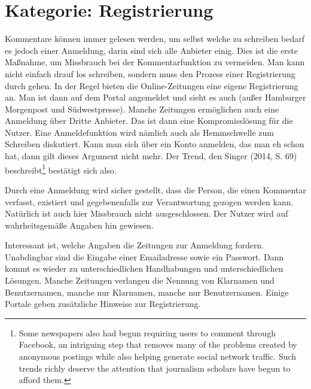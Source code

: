 

\section{Kategorie: \glqq Registrierung\grqq}

Kommentare können immer gelesen werden, um selbst welche zu schreiben bedarf es
jedoch einer Anmeldung, darin sind sich alle Anbieter einig. Dies ist die erste
Maßnahme, um Missbrauch bei der Kommentarfunktion zu vermeiden. Man kann nicht
einfach drauf los schreiben, sondern muss den Prozess einer Registrierung durch
gehen. In der Regel bieten die Online-Zeitungen eine eigene Registrierung an.
Man ist dann auf dem Portal angemeldet und sieht es auch (außer Hamburger
Morgenpost und Südwestpresse). Manche Zeitungen ermöglichen auch eine Anmeldung
über Dritte Anbieter. Das ist dann eine Kompromisslösung für die Nutzer. Eine
Anmeldefunktion wird nämlich auch als Hemmschwelle zum Schreiben diskutiert.
Kann man sich über ein Konto anmelden, das man eh schon hat, dann gilt dieses
Argument nicht mehr. Der Trend, den Singer (2014, S. 69)
beschreibt\footnote{\glqq Some newspapers also had begun requiring users to
comment through Facebook, an intriguing step that removes many of the problems
created by anonymous postings while also helping generate social network
traffic. Such trends richly deserve the attention that journalism scholars have
begun to afford them.\grqq} bestätigt sich also.

Durch eine Anmeldung wird sicher gestellt, dass die Person, die einen Kommentar
verfasst, existiert und gegebenenfalls zur Verantwortung gezogen werden kann.
Natürlich ist auch hier Missbrauch nicht ausgeschlossen. Der Nutzer wird auf
wahrheitsgemäße Angaben hin gewiesen. 

Interessant ist, welche Angaben die Zeitungen zur Anmeldung fordern. Unabdingbar
sind die Eingabe einer Emailadresse sowie ein Passwort. Dann kommt es wieder zu
unterschiedlichen Handhabungen und unterschiedlichen Lösungen. Manche Zeitungen
verlangen die Nennung von Klarnamen und Benutzernamen, manche nur Klarnamen,
manche nur Benutzernamen. Einige Portale geben zusätzliche Hinweise zur
Registrierung. 


